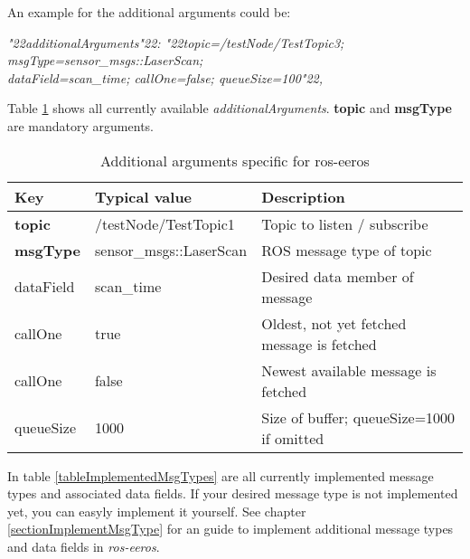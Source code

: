An example for the additional arguments could be:

\begin{snugshade*}
\textit{\char"22additionalArguments\char"22: \char"22topic=/testNode/TestTopic3; msgType=sensor\_msgs::LaserScan; \\
dataField=scan\_time; callOne=false; queueSize=100\char"22,}
\end{snugshade*}


Table \ref{tableAdditionalArgumentsEeros} shows all currently available \textit{additionalArguments}.
\textbf{topic} and \textbf{msgType} are mandatory arguments.

\begin{table}[]
\centering
\caption{Additional arguments specific for ros-eeros}
\label{tableAdditionalArgumentsEeros}
\begin{tabular}{@{}lll@{}}
\toprule
Key        & Typical value           & Description                                \\ \midrule
\textbf{topic}      & /testNode/TestTopic1    & Topic to listen / subscribe                \\
\textbf{msgType }   & sensor\_msgs::LaserScan & ROS message type of topic                  \\ 
dataField & scan\_time              & Desired data member of message             \\
callOne    & true                    & Oldest, not yet fetched message is fetched \\
callOne    & false                   & Newest available message is fetched        \\
queueSize  & 1000                    & Size of buffer; queueSize=1000 if omitted  \\ \bottomrule
\end{tabular}
\end{table}

In table \ref{tableImplementedMsgTypes} are all currently implemented message types and associated data fields.
If your desired message type is not implemented yet, you can easyly implement it yourself.
See chapter \ref{sectionImplementMsgType} for an guide to implement additional message types and data fields in \textit{ros-eeros}.

